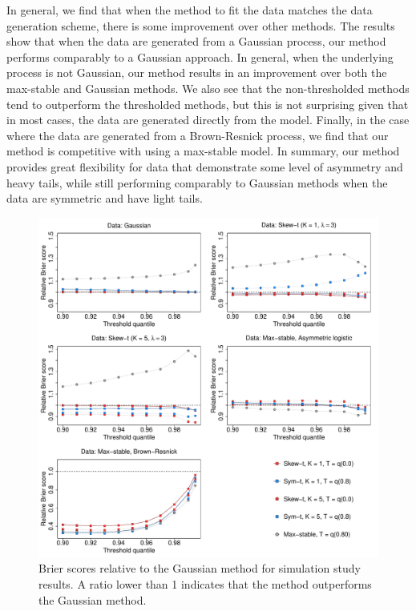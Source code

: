 In general, we find that when the method to fit the data matches the data generation scheme, there is some improvement over other methods.
The results show that when the data are generated from a Gaussian process, our method performs comparably to a Gaussian approach.
In general, when the underlying process is not Gaussian, our method results in an improvement over both the max-stable and Gaussian methods.
We also see that the non-thresholded methods tend to outperform the thresholded methods, but this is not surprising given that in most cases, the data are generated directly from the model.
Finally, in the case where the data are generated from a Brown-Resnick process, we find that our method is competitive with using a max-stable model.
In summary, our method provides great flexibility for data that demonstrate some level of asymmetry and heavy tails, while still performing comparably to Gaussian methods when the data are symmetric and have light tails.

\begin{figure}
  \includegraphics[width=\linewidth]{plots/bsplots-mean.pdf}
  \caption{Brier scores relative to the Gaussian method for simulation study results. A ratio lower than 1 indicates that the method outperforms the Gaussian method.}
  \label{stfig:simbrierscores}
\end{figure}


